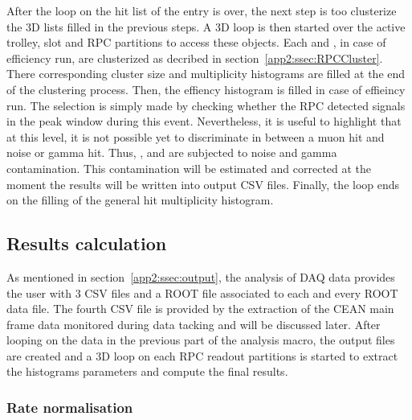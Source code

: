 	After the loop on the hit list of the entry is over, the next step is too clusterize the 3D lists filled in the previous steps. A 3D loop is then started over the active trolley, slot and RPC partitions to access these objects. Each  and , in case of efficiency run, are clusterized as decribed in section~\ref{app2:ssec:RPCCluster}. There corresponding cluster size and multiplicity histograms are filled at the end of the clustering process. Then, the effiency histogram is filled in case of effieincy run. The selection is simply made by checking whether the RPC detected signals in the peak window during this event. Nevertheless, it is useful to highlight that at this level, it is not possible yet to discriminate in between a muon hit and noise or gamma hit. Thus, ,  and  are subjected to noise and gamma contamination. This contamination will be estimated and corrected at the moment the results will be written into output CSV files. Finally, the loop ends on the filling of the general hit multiplicity histogram.
	
	\subsection{Results calculation}
	\label{app2:ssec:rate}
		
	As mentioned in section~\ref{app2:ssec:output}, the analysis of DAQ data provides the user with 3 CSV files and a ROOT file associated to each and every ROOT data file. The fourth CSV file is provided by the extraction of the CEAN main frame data monitored during data tacking and will be discussed later. After looping on the data in the previous part of the analysis macro, the output files are created and a 3D loop on each RPC readout partitions is started to extract the histograms parameters and compute the final results.\\
	
		\subsubsection{Rate normalisation}
		\label{app2:sssec:norm}
	
